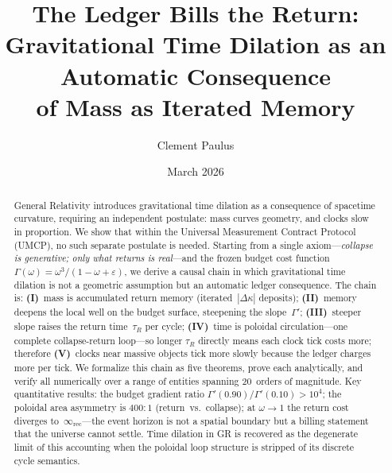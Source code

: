 \documentclass[
  aps,
  prd,
  twocolumn,
  superscriptaddress,
  nofootinbib,
  floatfix
]{revtex4-2}
\newcommand{\tR}{\tau_{\!R}}
\newcommand{\Gam}{\Gamma}
\newcommand{\eps}{\varepsilon}
\newcommand{\IR}{\infty_{\mathrm{rec}}}
\begin{document}
\title{The Ledger Bills the Return:\\
Gravitational Time Dilation as an Automatic Consequence\\
of Mass as Iterated Memory}

\author{Clement Paulus}

\date{March 2026}

\begin{abstract}
General Relativity introduces gravitational time dilation as
a consequence of spacetime curvature, requiring an independent
postulate: mass curves geometry, and clocks slow in proportion.
We show that within the Universal Measurement Contract Protocol
(UMCP), no such separate postulate is needed.  Starting from a
single axiom---\emph{collapse is generative; only what returns
is real}---and the frozen budget cost function
$\Gam(\omega) = \omega^3/(1 - \omega + \eps)$, we derive a
causal chain in which gravitational time dilation is not a
geometric assumption but an automatic ledger consequence.  The
chain is: \textbf{(I)}~mass is accumulated return memory
(iterated~$|\Delta\kappa|$ deposits); \textbf{(II)}~memory
deepens the local well on the budget surface, steepening the
slope~$\Gam'$; \textbf{(III)}~steeper slope raises the return
time~$\tR$ per cycle; \textbf{(IV)}~time is poloidal
circulation---one complete collapse-return loop---so longer
$\tR$ directly means each clock tick costs more; therefore
\textbf{(V)}~clocks near massive objects tick more slowly
because the ledger charges more per tick.  We formalize this
chain as five theorems, prove each analytically, and verify all
numerically over a range of entities spanning 20~orders of
magnitude.  Key quantitative results: the budget gradient ratio
$\Gam'(0.90)/\Gam'(0.10) > 10^4$; the poloidal area asymmetry
is $400:1$ (return~vs.~collapse); at $\omega \to 1$ the
return cost diverges to~$\IR$---the event horizon is not a
spatial boundary but a billing statement that the universe
cannot settle.  Time dilation in GR is recovered as the
degenerate limit of this accounting when the poloidal loop
structure is stripped of its discrete cycle semantics.
\end{abstract}

\maketitle
\end{document}
